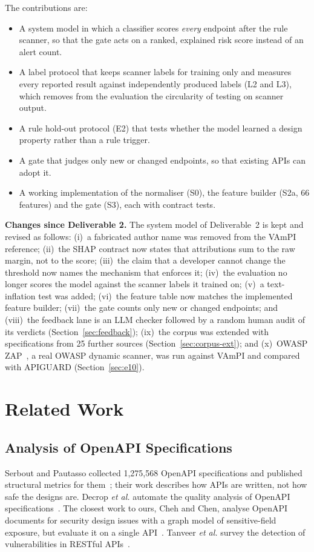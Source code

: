 \documentclass[conference]{IEEEtran}
\begin{document}
The contributions are:
\begin{itemize}
\item A system model in which a classifier scores \emph{every} endpoint after the rule scanner,
so that the gate acts on a ranked, explained risk score instead of an alert count.
\item A label protocol that keeps scanner labels for training only and measures every reported
result against independently produced labels (L2 and L3), which removes from the evaluation the circularity of testing on
scanner output.
\item A rule hold-out protocol (E2) that tests whether the model learned a design property
rather than a rule trigger.
\item A gate that judges only new or changed endpoints, so that existing APIs can adopt it.
\item A working implementation of the normaliser (S0), the feature builder (S2a, 66 features)
and the gate (S3), each with contract tests.
\end{itemize}

\textbf{Changes since Deliverable 2.} The system model of Deliverable~2 is kept and revised
as follows: (i)~a fabricated author name was removed from the VAmPI reference; (ii)~the SHAP
contract now states that attributions sum to the raw margin, not to the score; (iii)~the claim
that a developer cannot change the threshold now names the mechanism that enforces it;
(iv)~the evaluation no longer scores the model against the scanner labels it trained on;
(v)~a text-inflation test was added; (vi)~the feature table now
matches the implemented feature builder; (vii)~the gate counts only new or changed
endpoints; and (viii)~the feedback lane is an LLM checker followed by a random human audit of its verdicts (Section~\ref{sec:feedback}); (ix)~the corpus was extended with specifications from 25 further sources (Section~\ref{sec:corpus-ext}); and (x)~OWASP ZAP~\cite{zap}, a real OWASP dynamic scanner, was run against VAmPI and compared with APIGUARD (Section~\ref{sec:e10}).

\section{Related Work}
\subsection{Analysis of OpenAPI Specifications}
Serbout and Pautasso collected 1{,}275{,}568 OpenAPI specifications and published structural
metrics for them~\cite{apistic}; their work describes how APIs are written, not how safe the
designs are. Decrop \emph{et al.} automate the quality analysis of OpenAPI
specifications~\cite{oasquali}. The closest work to ours, Cheh and Chen, analyse OpenAPI
documents for security design issues with a graph model of sensitive-field exposure, but
evaluate it on a single API~\cite{cheh}. Tanveer \emph{et al.} survey the detection of
vulnerabilities in RESTful APIs~\cite{tanveer}.
\end{document}
